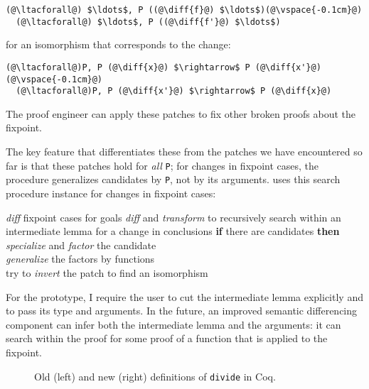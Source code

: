 \begin{lstlisting}[language=coq]
  (@\ltacforall@) $\ldots$, P ((@\diff{f}@) $\ldots$)(@\vspace{-0.1cm}@)
  (@\ltacforall@) $\ldots$, P ((@\diff{f'}@) $\ldots$)
\end{lstlisting}
for an isomorphism that corresponds to the change:

\begin{lstlisting}[language=coq]
  (@\ltacforall@)P, P (@\diff{x}@) $\rightarrow$ P (@\diff{x'}@)(@\vspace{-0.1cm}@)
  (@\ltacforall@)P, P (@\diff{x'}@) $\rightarrow$ P (@\diff{x}@)
\end{lstlisting}
The proof engineer can apply these patches to fix other broken proofs about the fixpoint.

The key feature that differentiates these from the patches we have encountered so far is that
these patches hold for \emph{all} \lstinline{P}; for changes in fixpoint cases, the procedure generalizes
candidates by \lstinline{P}, not by its arguments.
\sysname uses this search procedure instance for changes in fixpoint cases:

\begin{algorithm}
\footnotesize
\begin{algorithmic}[1]
    \STATE \textit{diff} fixpoint cases for goals
    \STATE \textit{diff} and \textit{transform} to recursively search within an intermediate lemma for a change in conclusions
    \STATE \textbf{if} there are candidates \textbf{then}
    \STATE \hspace*{1em} \textit{specialize} and \textit{factor} the candidate \\
           \hspace*{1em} \textit{generalize} the factors by functions \\
           \hspace*{1em} try to \textit{invert} the patch to find an isomorphism 
\end{algorithmic}
\end{algorithm}

For the prototype, I require the user to cut the intermediate lemma explicitly and to 
pass its type and arguments.
In the future, an improved semantic differencing component
can infer both the intermediate lemma and the arguments: it can search
within the proof for some proof of a function that is applied
to the fixpoint.

\begin{figure*}
\begin{minipage}{0.48\textwidth}
\lstset{language=coq, aboveskip=0pt,belowskip=0pt}

\end{minipage}
\hfill
\begin{minipage}{0.48\textwidth}
\lstset{language=coq, aboveskip=0pt,belowskip=0pt}

\end{minipage}
\caption[Caption for LOF]{Old (left) and new (right) definitions of \lstinline{divide} in Coq.}
\label{fig:divide}
\end{figure*}

